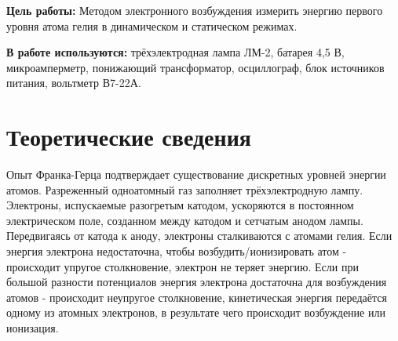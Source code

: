 \documentclass[a4paper,12pt]{article} %
\begin{document}
\noindent
\textbf{Цель работы:} Методом электронного возбуждения измерить энергию первого уровня атома гелия в динамическом и статическом режимах.
\medskip

\noindent \textbf{В работе используются:} трёхэлектродная лампа ЛМ-2, батарея 4,5 В, микроамперметр, понижающий трансформатор, осциллограф, блок источников питания, вольтметр В7-22А.

\medskip

\section{Теоретические сведения}

Опыт Франка-Герца подтверждает существование дискретных уровней энергии атомов. Разреженный одноатомный газ заполняет трёхэлектродную лампу. Электроны, испускаемые разогретым катодом, ускоряются в постоянном электрическом поле, созданном между катодом и сетчатым анодом лампы. Передвигаясь от катода к аноду, электроны сталкиваются с атомами гелия. Если энергия электрона недостаточна, чтобы возбудить/ионизировать атом - происходит упругое столкновение, электрон не теряет энергию.
Если при большой разности потенциалов энергия электрона достаточна для возбуждения атомов - происходит неупругое столкновение, кинетическая энергия передаётся одному из атомных электронов, в результате чего происходит возбуждение или ионизация.
\end{document}

